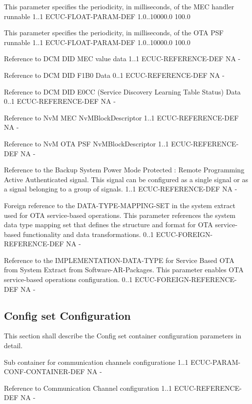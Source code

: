 {
{This parameter specifies the periodicity, in milliseconds, of the MEC handler runnable}
{1..1}
{ECUC-FLOAT-PARAM-DEF}
{1.0..10000.0}
{100.0}
}{}

{
{This parameter specifies the periodicity, in milliseconds, of the OTA PSF runnable}
{1..1}
{ECUC-FLOAT-PARAM-DEF}
{1.0..10000.0}
{100.0}
}{}

{Reference to DCM DID MEC value data}
{1..1}
{ECUC-REFERENCE-DEF}
{NA}
{-}

{Reference to DCM DID F1B0 Data}
{0..1}
{ECUC-REFERENCE-DEF}
{NA}
{-}

{
{Reference to DCM DID E0CC (Service Discovery Learning Table Status) Data}
{0..1}
{ECUC-REFERENCE-DEF}
{NA}
{-}
}
{ }

{Reference to NvM MEC NvMBlockDescriptor}
{1..1}
{ECUC-REFERENCE-DEF}
{NA}
{-}

{Reference to NvM OTA PSF NvMBlockDescriptor}
{1..1}
{ECUC-REFERENCE-DEF}
{NA}
{-}

{Reference to the Backup System Power Mode Protected : Remote Programming Active Authenticated signal. This signal can be configured as a single signal or as a signal belonging to a group of signals.}
{1..1}
{ECUC-REFERENCE-DEF}
{NA}
{-}

{Foreign reference to the DATA-TYPE-MAPPING-SET in the system extract used for OTA service-based operations. This parameter references the system data type mapping set that defines the structure and format for OTA service-based functionality and data transformations.}
{0..1}
{ECUC-FOREIGN-REFERENCE-DEF}
{NA}
{-}

{Reference to the IMPLEMENTATION-DATA-TYPE for Service Based OTA from System Extract from Software-AR-Packages. This parameter enables OTA service-based operations configuration.}
{0..1}
{ECUC-FOREIGN-REFERENCE-DEF}
{NA}
{-}

\subsection{Config set Configuration}

This section shall describe the Config set container configuration parameters in detail.

{Sub container for communication channels configuratione}
{1..1}
{ECUC-PARAM-CONF-CONTAINER-DEF}
{NA}
{-}

{Reference to Communication Channel configuration}
{1..1}
{ECUC-REFERENCE-DEF}
{NA}
{-}
